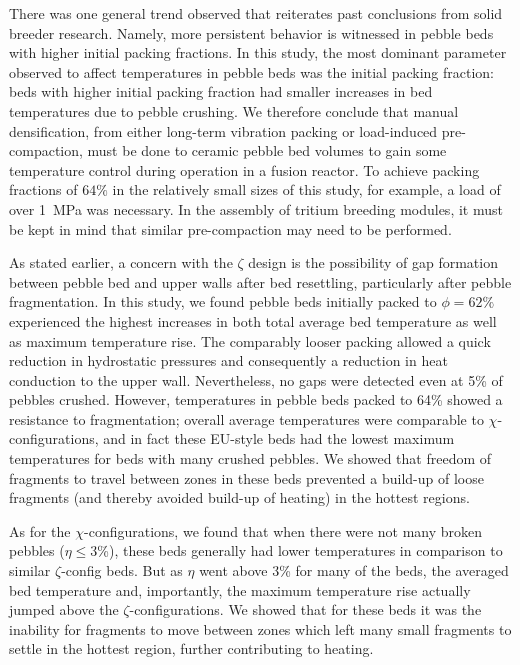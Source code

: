 There was one general trend observed that reiterates past conclusions from solid breeder research. Namely, more persistent behavior is witnessed in pebble beds with higher initial packing fractions. In this study, the most dominant parameter observed to affect temperatures in pebble beds was the initial packing fraction: beds with higher initial packing fraction had smaller increases in bed temperatures due to pebble crushing. We therefore conclude that manual densification, from either long-term vibration packing or load-induced pre-compaction, must be done to ceramic pebble bed volumes to gain some temperature control during operation in a fusion reactor. To achieve packing fractions of $64\%$ in the relatively small sizes of this study, for example, a load of over \SI{1}{\mega\pascal} was necessary. In the assembly of tritium breeding modules, it must be kept in mind that similar pre-compaction may need to be performed.

As stated earlier, a concern with the $\zeta$ design is the possibility of gap formation between pebble bed and upper walls after bed resettling, particularly after pebble fragmentation. In this study, we found pebble beds initially packed to $\phi = 62\%$ experienced the highest increases in both total average bed temperature as well as maximum temperature rise. The comparably looser packing allowed a quick reduction in hydrostatic pressures and consequently a reduction in heat conduction to the upper wall. Nevertheless, no gaps were detected even at 5\% of pebbles crushed. However, temperatures in pebble beds packed to 64\% showed a resistance to fragmentation; overall average temperatures were comparable to $\chi$-configurations, and in fact these EU-style beds had the lowest maximum temperatures for beds with many crushed pebbles. We showed that freedom of fragments to travel between zones in these beds prevented a build-up of loose fragments (and thereby avoided build-up of heating) in the hottest regions.

As for the $\chi$-configurations, we found that when there were not many broken pebbles ($\eta \le 3$\%), these beds generally had lower temperatures in comparison to similar $\zeta$-config beds. But as $\eta$ went above 3\% for many of the beds, the averaged bed temperature and, importantly, the maximum temperature rise actually jumped above the $\zeta$-configurations. We showed that for these beds it was the inability for fragments to move between zones which left many small fragments to settle in the hottest region, further contributing to heating.

